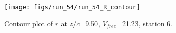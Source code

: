 \begin{figure}[H]
\centering
\texttt{[image: figs/run\_54/run\_54\_R\_contour]}
\caption{Contour plot of $\overline{r}$ at $z/c$=9.50, $V_{free}$=21.23, station 6.}
\end{figure}


